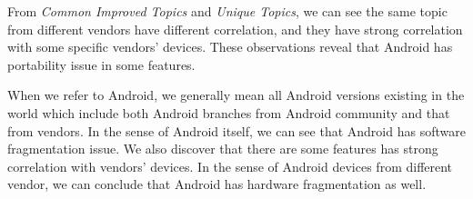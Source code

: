 \documentclass[10pt, conference, compsocconf]{IEEEtran}
\begin{document}
From \textit{Common Improved Topics} and \textit{Unique Topics}, we can see the same topic from different vendors have different correlation, and they have strong correlation with some specific vendors' devices. These observations reveal that Android has portability issue in some features.

When we refer to Android, we generally mean all Android versions existing in the world which include both Android branches from Android community and that from vendors. In the sense of Android itself, we can see that Android has software fragmentation issue. We also discover that there are some features has strong correlation with vendors' devices. In the sense of Android devices from different vendor, we can conclude that Android has hardware fragmentation as well.


%
%
%


\end{document}
